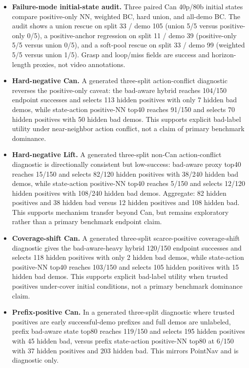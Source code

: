 \documentclass{article}
\begin{document}
\begin{itemize}[leftmargin=*]
  \item \textbf{Failure-mode initial-state audit.} Three paired Can 40p/80b initial states compare positive-only NN, weighted BC, hard union, and all-demo BC. The audit shows a union rescue on split 33 / demo 105 (union 5/5 versus positive-only 0/5), a positive-anchor regression on split 11 / demo 39 (positive-only 5/5 versus union 0/5), and a soft-pool rescue on split 33 / demo 99 (weighted 5/5 versus union 1/5). Grasp and loop/miss fields are success and horizon-length proxies, not video annotations.
  \item \textbf{Hard-negative Can.} A generated three-split action-conflict diagnostic reverses the positive-only caveat: the bad-aware hybrid reaches 104/150 endpoint successes and selects 113 hidden positives with only 7 hidden bad demos, while state-action positive-NN top40 reaches 91/150 and selects 70 hidden positives with 50 hidden bad demos. This supports explicit bad-label utility under near-neighbor action conflict, not a claim of primary benchmark dominance.
  \item \textbf{Hard-negative Lift.} A generated three-split non-Can action-conflict diagnostic is directionally consistent but low-success: bad-aware proxy top40 reaches 15/150 and selects 82/120 hidden positives with 38/240 hidden bad demos, while state-action positive-NN top40 reaches 5/150 and selects 12/120 hidden positives with 108/240 hidden bad demos. Aggregate: 82 hidden positives and 38 hidden bad versus 12 hidden positives and 108 hidden bad. This supports mechanism transfer beyond Can, but remains exploratory rather than a primary benchmark endpoint claim.
  \item \textbf{Coverage-shift Can.} A generated three-split scarce-positive coverage-shift diagnostic gives the bad-aware-heavy hybrid 120/150 endpoint successes and selects 118 hidden positives with only 2 hidden bad demos, while state-action positive-NN top40 reaches 103/150 and selects 105 hidden positives with 15 hidden bad demos. This supports explicit bad-label utility when trusted positives under-cover initial conditions, not a primary benchmark dominance claim.
  \item \textbf{Prefix-positive Can.} In a generated three-split diagnostic where trusted positives are early successful-demo prefixes and full demos are unlabeled, prefix bad-aware state top80 reaches 119/150 and selects 195 hidden positives with 45 hidden bad, versus prefix state-action positive-NN top80 at 6/150 with 37 hidden positives and 203 hidden bad. This mirrors PointNav and is diagnostic only.

\end{itemize}
\end{document}
